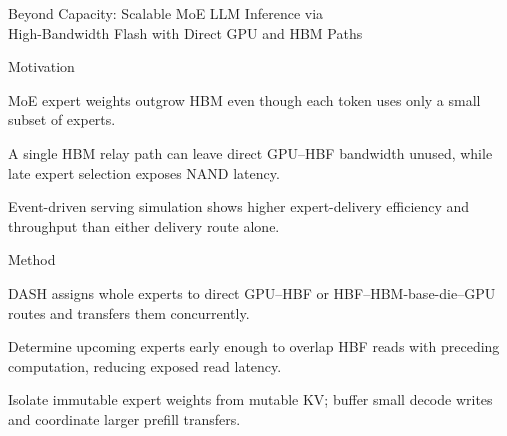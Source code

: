 \begin{frame}[t]{Beyond Capacity: Scalable MoE LLM Inference via\\High-Bandwidth Flash with Direct GPU and HBM Paths}
\vspace{.02cm}
\begin{minipage}[t][3.25cm][t]{\linewidth}
\begin{summarysection}{Motivation}
\item {} MoE expert weights outgrow HBM even though each token uses only a small subset of experts.
\item {} A single HBM relay path can leave direct GPU--HBF bandwidth unused, while late expert selection exposes NAND latency.
\item {} Event-driven serving simulation shows higher expert-delivery efficiency and throughput than either delivery route alone.
\end{summarysection}
\end{minipage}
\vspace{.18cm}
\begin{summarysection}{Method}
\item {} DASH assigns whole experts to direct GPU--HBF or HBF--HBM-base-die--GPU routes and transfers them concurrently.
\item {} Determine upcoming experts early enough to overlap HBF reads with preceding computation, reducing exposed read latency.
\item {} Isolate immutable expert weights from mutable KV; buffer small decode writes and coordinate larger prefill transfers.
\end{summarysection}
\end{frame}
